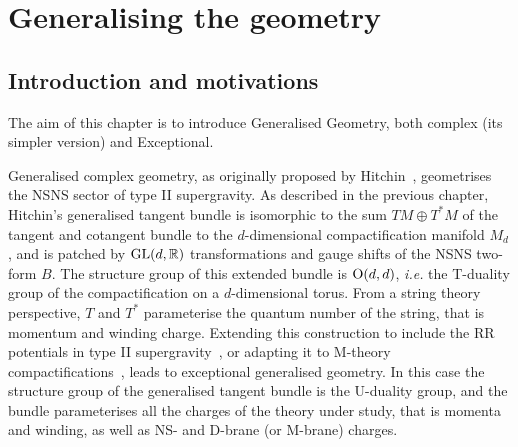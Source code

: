 \documentclass[debug]{phd}
\begin{document}
	\chapter{Generalising the geometry}
	\label{chapEGG}
		\section{Introduction and motivations}
			The aim of this chapter is to introduce Generalised Geometry, both complex (its simpler version) and Exceptional.
	
					Generalised complex geometry, as originally proposed by Hitchin~\cite{hitch1, gualtphd}, geometrises the NSNS sector of type II supergravity. 
					As described in the previous chapter, Hitchin's generalised tangent bundle is isomorphic to the sum $TM \oplus T^*M$ of the tangent and cotangent bundle to the $d$-dimensional compactification manifold $M_d$, and is patched by $\mathrm{GL}(d,\mathbb{R})$ transformations and gauge shifts of the NSNS two-form $B$. 
					The structure group of this extended bundle is $\mathrm{O}(d,d)$, \emph{i.e.} the T-duality group of the compactification on a $d$-dimensional torus.
					From a string theory perspective, $T$ and $T^*$ parameterise the quantum number of the string, that is momentum and winding charge.
					Extending this construction to include the RR potentials in type II supergravity~\cite{hull1, Grana:2009im, waldram4}, or adapting it to M-theory compactifications~\cite{hull1, waldram5, Coimbra:2011ky}, leads to exceptional generalised geometry. 
					In this case the structure group of the generalised tangent bundle is the U-duality group, and the bundle parameterises all the charges of the theory under study, that is momenta and winding, as well as NS- and D-brane (or M-brane) charges.
					
%			
%
\end{document}
